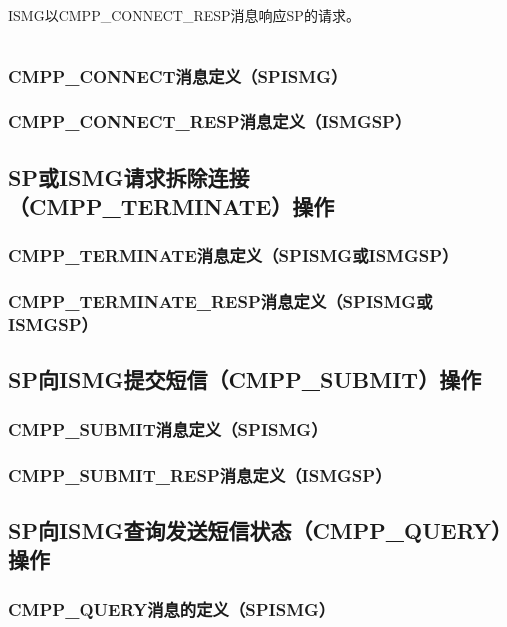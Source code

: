 \documentclass[11pt]{book} %
\begin{document}
ISMG以CMPP\_CONNECT\_RESP消息响应SP的请求。

\begin{longtable}{|m{40pt}|m{30pt}|m{80pt}|m{150pt}|}



\end{longtable}

\subsubsection{CMPP\_CONNECT消息定义（SP\textrightarrow ISMG）}





\subsubsection{CMPP\_CONNECT\_RESP消息定义（ISMG\textrightarrow SP）}


\subsection{SP或ISMG请求拆除连接（CMPP\_TERMINATE）操作}
\subsubsection{CMPP\_TERMINATE消息定义（SP\textrightarrow ISMG或ISMG\textrightarrow SP）}
\subsubsection{CMPP\_TERMINATE\_RESP消息定义（SP\textrightarrow ISMG或ISMG\textrightarrow SP）}
\subsection{SP向ISMG提交短信（CMPP\_SUBMIT）操作}
\subsubsection{CMPP\_SUBMIT消息定义（SP\textrightarrow ISMG）}
\subsubsection{CMPP\_SUBMIT\_RESP消息定义（ISMG\textrightarrow SP）}
\subsection{SP向ISMG查询发送短信状态（CMPP\_QUERY）操作}
\subsubsection{CMPP\_QUERY消息的定义（SP\textrightarrow ISMG）}
\end{document}
